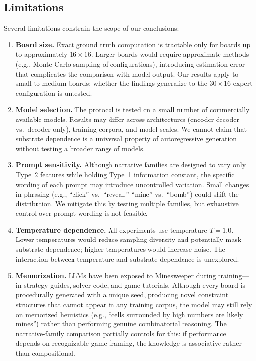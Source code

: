 \documentclass[12pt,a4paper]{article}
\begin{document}
\subsection{Limitations}
\label{sec:limitations}

Several limitations constrain the scope of our conclusions:

\begin{enumerate}[nosep]
    \item \textbf{Board size.} Exact ground truth computation is tractable only for boards up to approximately $16 \times 16$. Larger boards would require approximate methods (e.g., Monte Carlo sampling of configurations), introducing estimation error that complicates the comparison with model output. Our results apply to small-to-medium boards; whether the findings generalize to the $30 \times 16$ expert configuration is untested.

    \item \textbf{Model selection.} The protocol is tested on a small number of commercially available models. Results may differ across architectures (encoder-decoder vs.\ decoder-only), training corpora, and model scales. We cannot claim that substrate dependence is a universal property of autoregressive generation without testing a broader range of models.

    \item \textbf{Prompt sensitivity.} Although narrative families are designed to vary only Type~2 features while holding Type~1 information constant, the specific wording of each prompt may introduce uncontrolled variation. Small changes in phrasing (e.g., ``click'' vs.\ ``reveal,'' ``mine'' vs.\ ``bomb'') could shift the distribution. We mitigate this by testing multiple families, but exhaustive control over prompt wording is not feasible.

    \item \textbf{Temperature dependence.} All experiments use temperature $T = 1.0$. Lower temperatures would reduce sampling diversity and potentially mask substrate dependence; higher temperatures would increase noise. The interaction between temperature and substrate dependence is unexplored.

    \item \textbf{Memorization.} LLMs have been exposed to Minesweeper during training---in strategy guides, solver code, and game tutorials. Although every board is procedurally generated with a unique seed, producing novel constraint structures that cannot appear in any training corpus, the model may still rely on memorized heuristics (e.g., ``cells surrounded by high numbers are likely mines'') rather than performing genuine combinatorial reasoning. The narrative-family comparison partially controls for this: if performance depends on recognizable game framing, the knowledge is associative rather than compositional.


\end{enumerate}
\end{document}
